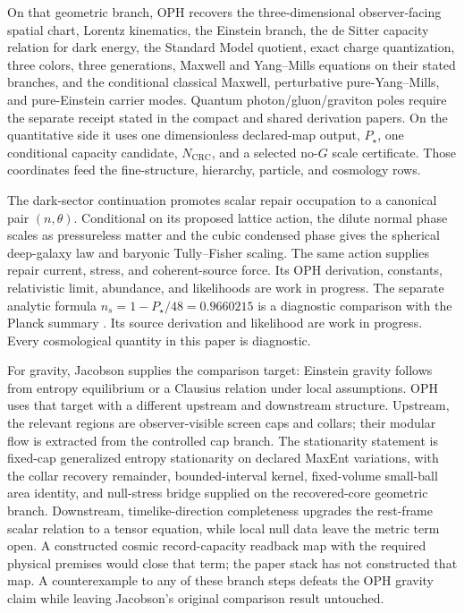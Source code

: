 \documentclass[11pt]{article}
\begin{document}
On that geometric branch, OPH recovers the three-dimensional observer-facing spatial chart, Lorentz kinematics, the Einstein branch, the de Sitter
capacity relation for dark energy, the Standard Model quotient, exact charge quantization, three
colors, three generations, Maxwell and Yang--Mills equations on their stated branches, and the
conditional classical Maxwell, perturbative pure-Yang--Mills, and pure-Einstein carrier modes.
Quantum photon/gluon/graviton poles require the separate receipt stated in the compact and shared
derivation papers. On the quantitative side it uses one dimensionless declared-map output,
\(P_\star\), one conditional capacity candidate, \(N_{\mathrm{CRC}}\), and a selected no-\(G\) scale certificate.
Those coordinates feed the fine-structure, hierarchy, particle, and cosmology rows.

The dark-sector continuation promotes scalar repair occupation to a canonical
pair \((n,\theta)\). Conditional on its proposed lattice action, the dilute
normal phase scales as pressureless matter and the cubic condensed phase gives
the spherical deep-galaxy law and baryonic Tully--Fisher scaling. The same
action supplies repair current, stress, and coherent-source force. Its OPH
derivation, constants, relativistic limit, abundance, and likelihoods are work
in progress. The separate analytic formula
$n_s=1-P_\star/48=0.9660215$ is a diagnostic comparison with the Planck
summary \cite{planck18,ophdarkmatter}. Its source derivation and likelihood are
work in progress. Every cosmological quantity in this paper is diagnostic.

For gravity, Jacobson supplies the comparison target: Einstein gravity follows from entropy
equilibrium or a Clausius relation under local assumptions. OPH uses that target with a different
upstream and downstream structure. Upstream, the relevant regions are observer-visible screen caps
and collars; their modular flow is extracted from the controlled cap branch. The stationarity
statement is fixed-cap generalized entropy stationarity on declared MaxEnt variations, with the
collar recovery remainder, bounded-interval kernel, fixed-volume small-ball area identity, and
null-stress bridge supplied on the recovered-core geometric branch. Downstream,
timelike-direction completeness upgrades the rest-frame scalar relation to a tensor equation,
while local null data leave the metric term open. A constructed cosmic record-capacity readback
map with the required physical premises would close that term; the paper stack has not constructed
that map. A
counterexample to any of these branch steps defeats the OPH gravity claim while leaving Jacobson's
original comparison result untouched.
\end{document}
